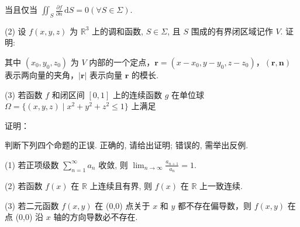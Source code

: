 当且仅当 $\iint_{S} \frac{\partial f}{\partial n} \, \mathrm{d}S = 0 (\forall S \in \Sigma)$.\par
\par{}
(2) 设 $f(x, y, z)$ 为 $\mathbb{R}^3$ 上的调和函数, $S \in \Sigma$, 且 $S$ 围成的有界闭区域记作 $V$. 证明:\par
\nopagebreak[4]
其中 $(x_0, y_0, z_0)$ 为 $V$ 内部的一个定点，$\pmb{r} = (x - x_0, y - y_0, z - z_0)$，$(\pmb{r}, \pmb{n})$ 表示两向量的夹角，$|\pmb{r}|$ 表示向量 $\pmb{r}$ 的模长.\par
\par{}
(3) 若函数 $f$ 和闭区间 $[0,1]$ 上的连续函数 $g$ 在单位球 $\Omega = \{(x,y,z) \mid x^2 + y^2 + z^2 \leq 1\}$ 上满足\par
\nopagebreak[4]
证明： \par
\par{}
判断下列四个命题的正误. 正确的, 请给出证明; 错误的, 需举出反例.\par
(1) 若正项级数 $\sum_{n=1}^{\infty} a_n$ 收敛, 则 $\lim_{n \to \infty} \frac{a_{n+1}}{a_n} = 1$.\par
(2) 若函数 $f(x)$ 在 $\mathbb{R}$ 上连续且有界, 则 $f(x)$ 在 $\mathbb{R}$ 上一致连续.\par
(3) 若二元函数 $f(x, y)$ 在 (0,0) 点关于 $x$ 和 $y$ 都不存在偏导数，则 $f(x, y)$ 在点 (0,0) 沿 $x$ 轴的方向导数必不存在.\par
